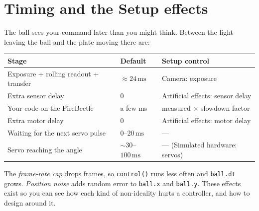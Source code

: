 \documentclass[10pt,a4paper]{article}
\newcommand{\un}[1]{\,\mathrm{#1}}
\begin{document}
\section{Timing and the Setup effects}\label{sec:timing}
The ball sees your command later than you might think. Between the light leaving the ball and
the plate moving there are:
\begin{center}
\begin{tabular}{lll}
\toprule
Stage & Default & Setup control\\
\midrule
Exposure + rolling readout + transfer & $\approx24\un{ms}$ & Camera: exposure\\
Extra sensor delay & $0$ & Artificial effects: sensor delay\\
Your code on the FireBeetle & a few ms & measured $\times$ slowdown factor\\
Extra motor delay & $0$ & Artificial effects: motor delay\\
Waiting for the next servo pulse & $0$--$20\un{ms}$ & ---\\
Servo reaching the angle & $\sim30$--$100\un{ms}$ & --- (Simulated hardware: servos)\\
\bottomrule
\end{tabular}
\end{center}
The \emph{frame-rate cap} drops frames, so \texttt{control()} runs less often and
\texttt{ball.dt} grows. \emph{Position noise} adds random error to \texttt{ball.x} and
\texttt{ball.y}. These effects exist so you can see how each kind of non-ideality hurts a
controller, and how to design around it.

\end{document}
